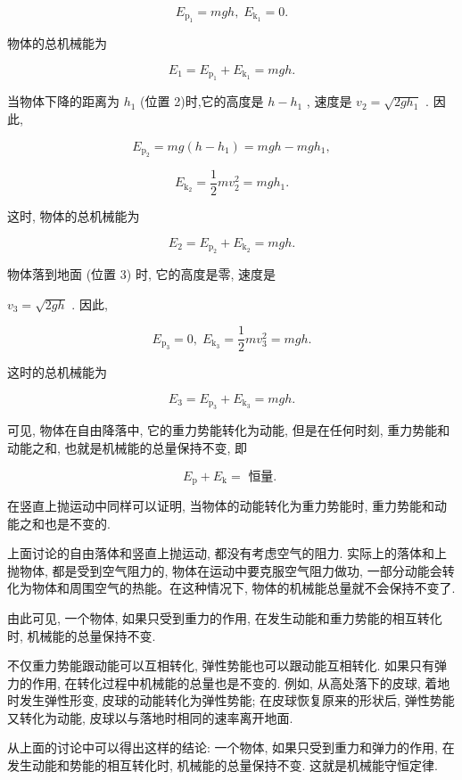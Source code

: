\documentclass[10pt]{article}
\begin{document}
\[
{E}_{{\mathrm{p}}_{1}} = {mgh},\;{E}_{{\mathrm{k}}_{1}} = 0.
\]

物体的总机械能为

\[
{E}_{1} = {E}_{{\mathrm{p}}_{1}} + {E}_{{\mathrm{k}}_{1}} = {mgh}.
\]

当物体下降的距离为 \({h}_{1}\) (位置 2)时,它的高度是 \(h - {h}_{1}\) , 速度是 \({v}_{2} = \sqrt{{2g}{h}_{1}}\) . 因此,

\[
{E}_{{\mathrm{p}}_{2}} = {mg}\left( {h - {h}_{1}}\right) = {mgh} - {mg}{h}_{1},
\]

\[
{E}_{{\mathrm{k}}_{2}} = \frac{1}{2}m{v}_{2}^{2} = {mg}{h}_{1}.
\]

这时, 物体的总机械能为

\[
{E}_{2} = {E}_{{\mathrm{p}}_{2}} + {E}_{{\mathrm{k}}_{2}} = {mgh}.
\]

物体落到地面 (位置 3) 时, 它的高度是零, 速度是

\({v}_{3} = \sqrt{2gh}\) . 因此,

\[
{E}_{{\mathrm{p}}_{3}} = 0,\;{E}_{{\mathrm{k}}_{3}} = \frac{1}{2}m{v}_{3}^{2} = {mgh}.
\]

这时的总机械能为

\[
{E}_{3} = {E}_{{\mathrm{p}}_{3}} + {E}_{{\mathrm{k}}_{3}} = {mgh}.
\]

可见, 物体在自由降落中, 它的重力势能转化为动能, 但是在任何时刻, 重力势能和动能之和, 也就是机械能的总量保持不变, 即

\[
{E}_{\mathrm{p}} + {E}_{\mathrm{k}} = \text{ 恒量. }
\]

在竖直上抛运动中同样可以证明, 当物体的动能转化为重力势能时, 重力势能和动能之和也是不变的.

上面讨论的自由落体和竖直上抛运动, 都没有考虑空气的阻力. 实际上的落体和上抛物体, 都是受到空气阻力的, 物体在运动中要克服空气阻力做功, 一部分动能会转化为物体和周围空气的热能。在这种情况下, 物体的机械能总量就不会保持不变了.

由此可见, 一个物体, 如果只受到重力的作用, 在发生动能和重力势能的相互转化时, 机械能的总量保持不变.

不仅重力势能跟动能可以互相转化, 弹性势能也可以跟动能互相转化. 如果只有弹力的作用, 在转化过程中机械能的总量也是不变的. 例如, 从高处落下的皮球, 着地时发生弹性形变, 皮球的动能转化为弹性势能; 在皮球恢复原来的形状后, 弹性势能又转化为动能, 皮球以与落地时相同的速率离开地面.

从上面的讨论中可以得出这样的结论: 一个物体, 如果只受到重力和弹力的作用, 在发生动能和势能的相互转化时, 机械能的总量保持不变. 这就是机械能守恒定律.
\end{document}
